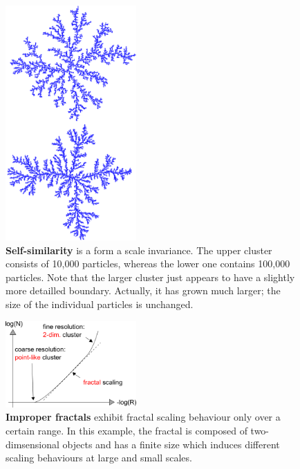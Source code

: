 \documentclass[twocolumn,10pt]{scrartcl}
\begin{document}
        \begin{figure}
            \center
            \includegraphics[width=5cm]{img/selfsim.png}
            \caption[Self-similarity]
                {\small\textbf{Self-similarity} is a form a scale invariance. The upper cluster consists of 10,000
                particles, whereas the lower one contains 100,000 particles. Note that the larger cluster just appears
                to have a slightly more detailled boundary. Actually, it has grown much larger; the size of the
                individual particles is unchanged.}
            \label{fig-selfsim}
        \end{figure}

        \begin{figure}
            \center
            \includegraphics[width=5cm]{img/scale.png}
            \caption[Improper fractals]
                {\small\textbf{Improper fractals} exhibit fractal scaling behaviour only over a certain range.
                In this example, the fractal is composed of two-dimsensional objects and has a finite size
                which induces different scaling behaviours at large and small scales.}
            \label{fig-scale}
        \end{figure}
\end{document}
